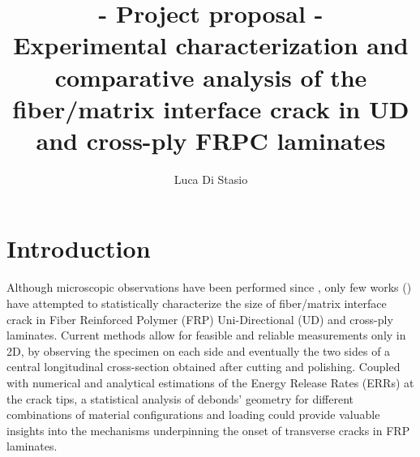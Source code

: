 \documentclass[review]{elsarticle}
\begin{document}
\begin{frontmatter}

\title{{\bf - Project proposal -}\\Experimental characterization and comparative analysis of the fiber/matrix interface crack in UD and cross-ply FRPC laminates}


\author{Luca Di Stasio}






\end{frontmatter}

\linenumbers

\section{Introduction}

Although microscopic observations have been performed since , only few works (\cite{Correa2018,Zumaquero2018}) have attempted to statistically characterize the size of fiber/matrix interface crack in Fiber Reinforced Polymer (FRP) Uni-Directional (UD) and cross-ply laminates. Current methods allow for feasible and reliable measurements only in 2D, by observing the specimen on each side and eventually the two sides of a central longitudinal cross-section obtained after cutting and polishing. Coupled with numerical and analytical estimations of the Energy Release Rates (ERRs) at the crack tips, a statistical analysis of debonds' geometry for different combinations of material configurations and loading could provide valuable insights into the mechanisms underpinning the onset of transverse cracks in FRP laminates.
\end{document}

